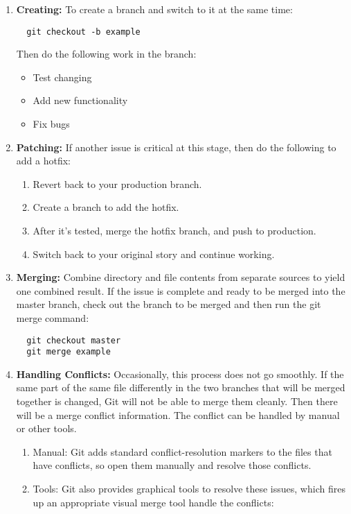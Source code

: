 \documentclass[draftclsnofoot,journal,onecolumn,12pt]{IEEEtran}
\begin{document}
\begin{enumerate}
\item \textbf{Creating:} To create a branch and switch to it at the same time:
\begin{verbatim}
  git checkout -b example
\end{verbatim}
Then do the following work in the branch:
  \begin{itemize}
    \item Test changing
    \item Add new functionality
    \item Fix bugs
  \end{itemize}
\item \textbf{Patching:} If another issue is critical at this stage, then do the following to add a hotfix:
\begin{enumerate}
  \item Revert back to your production branch.
  \item Create a branch to add the hotfix.
  \item After it’s tested, merge the hotfix branch, and push to production.
  \item Switch back to your original story and continue working.
\end{enumerate}
\item \textbf{Merging:} Combine directory and file contents from separate sources to yield one combined result. If the issue is complete and ready to be merged into the master branch, check out the branch to be merged and then run the git merge command:
\begin{verbatim}
  git checkout master
  git merge example
\end{verbatim}
\item \textbf{Handling Conflicts:} Occasionally, this process does not go smoothly. If the same part of the same file differently in the two branches that will be merged together is changed, Git will not be able to merge them cleanly. Then there will be a merge conflict information. The conflict can be handled by manual or other tools.
  \begin{enumerate}
    \item Manual: Git adds standard conflict-resolution markers to the files that have conflicts, so open them manually and resolve those conflicts.
    \item Tools: Git also provides graphical tools to resolve these issues, which fires up an appropriate visual merge tool handle the conflicts:
  \end{enumerate} 

\end{enumerate}
\end{document}
